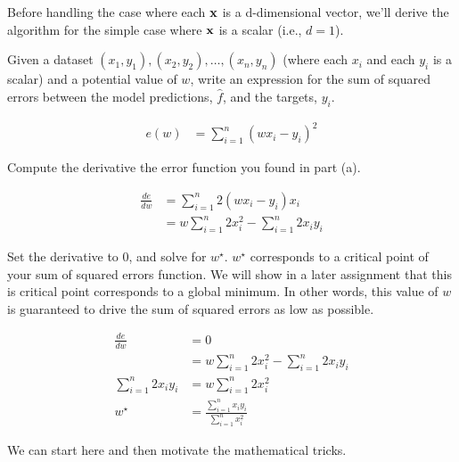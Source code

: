 \documentclass[assignment01_Solutions]{subfiles}
\begin{document}
Before handling the case where each $\mathbf{x}$ is a d-dimensional vector, we'll derive the algorithm for the simple case where $\mathbf{x}$ is a scalar (i.e., $d=1$).

\begin{exercise}
\bes
\item Given a dataset $(x_1, y_1), (x_2, y_2), \ldots, (x_n, y_n)$ (where each $x_i$ and each $y_i$ is a scalar) and a potential value of $w$, write an expression for the sum of squared errors between the model predictions, $\hat{f}$, and the targets, $y_i$.

\begin{boxedsolution}
\begin{align}
e(w) &= \sum_{i=1}^n \left (  w x_i - y_i \right)^2
\end{align}
\end{boxedsolution}
\fi

\item Compute the derivative the error function you found in part (a).

\begin{boxedsolution}
\begin{align}
\frac{de}{dw} &= \sum_{i=1}^n 2 \left (  w x_i - y_i \right)x_i \\
&= w \sum_{i=1}^n 2 x_i^2 - \sum_{i=1}^n 2 x_i y_i
\end{align}
\end{boxedsolution}
\fi

\item Set the derivative to 0, and solve for $w^\star$.  $w^\star$ corresponds to a critical point of your sum of squared errors function.  We will show in a later assignment that this is critical point corresponds to a global minimum.  In other words, this value of $w$ is guaranteed to drive the sum of squared errors as low as possible.

\begin{boxedsolution}
\begin{align}
\frac{de}{dw} &= 0 \\
&= w \sum_{i=1}^n 2 x_i^2 - \sum_{i=1}^n 2 x_i y_i \\
\sum_{i=1}^n 2 x_i y_i  &= w \sum_{i=1}^n 2 x_i^2 \\
w^\star &=\frac{\sum_{i=1}^n x_i y_i}{\sum_{i=1}^n x_i^2}
\end{align}
\end{boxedsolution}
\fi

\ees


\end{exercise}
We can start here and then motivate the mathematical tricks.
\end{document}
